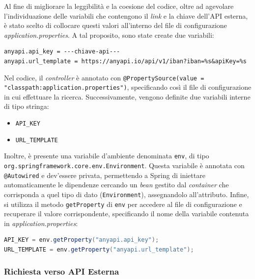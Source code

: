 Al fine di migliorare la leggibilità e la coesione del codice, oltre ad agevolare l’individuazione delle variabili che contengono il \textit{link} e la chiave dell’API esterna, è stato scelto di collocare questi valori all’interno del file di configurazione \textit{application.properties}. A tal proposito, sono state create due variabili:
\begin{lstlisting}[caption=Dichiarazione delle variabili all'interno del file di configurazione.]
anyapi.api_key = ---chiave-api---
anyapi.url_template = https://anyapi.io/api/v1/iban?iban=%s&apiKey=%s
\end{lstlisting}
Nel codice, il \textit{controller} è annotato con \texttt{@PropertySource(value = \\"classpath:application.properties")}, specificando così il file di configurazione in cui effettuare la ricerca. Successivamente, vengono definite due variabili interne di tipo stringa:
\begin{itemize}
    \item \texttt{API\_KEY}
    \item \texttt{URL\_TEMPLATE}
\end{itemize}
Inoltre, è presente una variabile d’ambiente denominata \texttt{env}, di tipo \\\texttt{org.springframework.core.env.Environment}. Questa variabile è annotata con \\\texttt{@Autowired} e dev’essere privata, permettendo a Spring di iniettare automaticamente le dipendenze cercando un \textit{bean} gestito dal \textit{container} che corrisponda a quel tipo di dato (\texttt{Environment}), assegnandolo all’attributo. Infine, si utilizza il metodo \texttt{getProperty} di \texttt{env} per accedere al file di configurazione e recuperare il valore corrispondente, specificando il nome della variabile contenuta in \textit{application.properties}:
\begin{lstlisting}[language=Java, caption=Recupero delle informazioni per effettuare la chiamata all'API.]
API_KEY = env.getProperty("anyapi.api_key");
URL_TEMPLATE = env.getProperty("anyapi.url_template");
\end{lstlisting}

\subsubsection{Richiesta verso API Esterna}


